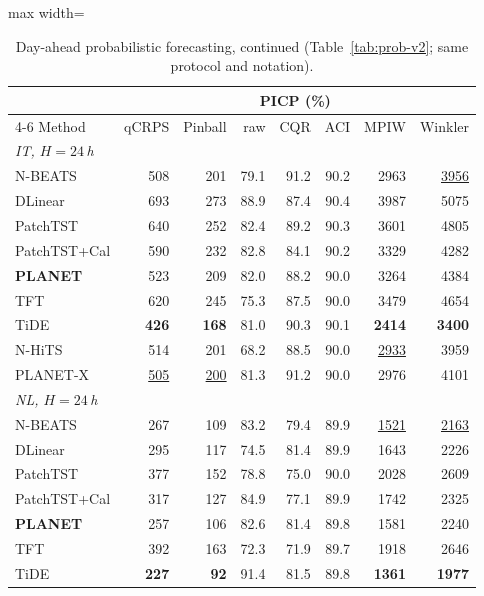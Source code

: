 \begin{table}[!t]
\centering
\caption{Day-ahead probabilistic forecasting, continued (Table~\ref{tab:prob-v2}; same protocol and notation).}
\label{tab:prob-v2-b}
\setlength{\tabcolsep}{3pt}\footnotesize
\begin{adjustbox}{max width=\linewidth}
\begin{tabular}{lrrrrrrr}
\toprule
 & & & \multicolumn{3}{c}{PICP (\%)} & & \\
\cmidrule(lr){4-6}
Method & qCRPS & Pinball & raw & CQR & ACI & MPIW & Winkler \\
\midrule
\multicolumn{8}{l}{\textit{IT, $H=24$\,h}} \\
\quad N-BEATS & 508 & 201 & 79.1 & 91.2 & 90.2 & 2963 & \underline{3956} \\
\quad DLinear & 693 & 273 & 88.9 & 87.4 & 90.4 & 3987 & 5075 \\
\quad PatchTST & 640 & 252 & 82.4 & 89.2 & 90.3 & 3601 & 4805 \\
\quad PatchTST+Cal & 590 & 232 & 82.8 & 84.1 & 90.2 & 3329 & 4282 \\
\quad \textbf{PLANET} & 523 & 209 & 82.0 & 88.2 & 90.0 & 3264 & 4384 \\
\quad TFT & 620 & 245 & 75.3 & 87.5 & 90.0 & 3479 & 4654 \\
\quad TiDE & \textbf{426} & \textbf{168} & 81.0 & 90.3 & 90.1 & \textbf{2414} & \textbf{3400} \\
\quad N-HiTS & 514 & 201 & 68.2 & 88.5 & 90.0 & \underline{2933} & 3959 \\
\quad PLANET-X & \underline{505} & \underline{200} & 81.3 & 91.2 & 90.0 & 2976 & 4101 \\
\midrule
\multicolumn{8}{l}{\textit{NL, $H=24$\,h}} \\
\quad N-BEATS & 267 & 109 & 83.2 & 79.4 & 89.9 & \underline{1521} & \underline{2163} \\
\quad DLinear & 295 & 117 & 74.5 & 81.4 & 89.9 & 1643 & 2226 \\
\quad PatchTST & 377 & 152 & 78.8 & 75.0 & 90.0 & 2028 & 2609 \\
\quad PatchTST+Cal & 317 & 127 & 84.9 & 77.1 & 89.9 & 1742 & 2325 \\
\quad \textbf{PLANET} & 257 & 106 & 82.6 & 81.4 & 89.8 & 1581 & 2240 \\
\quad TFT & 392 & 163 & 72.3 & 71.9 & 89.7 & 1918 & 2646 \\
\quad TiDE & \textbf{227} & \textbf{92} & 91.4 & 81.5 & 89.8 & \textbf{1361} & \textbf{1977} \\

\end{tabular}
\end{adjustbox}
\end{table}
